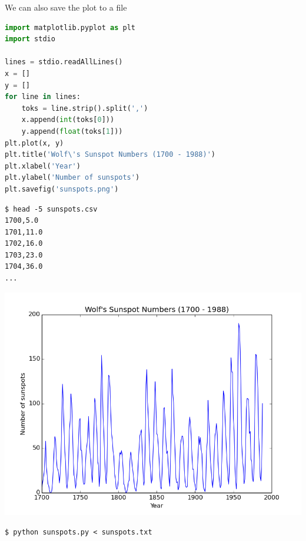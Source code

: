 \documentclass[8pt,a4paper,compress]{beamer}
\begin{document}
\begin{frame}[fragile]
We can also save the plot to a file

\begin{minipage}{200pt}
\begin{lstlisting}[language=Python]
import matplotlib.pyplot as plt
import stdio

lines = stdio.readAllLines()
x = []
y = []
for line in lines:
    toks = line.strip().split(',')
    x.append(int(toks[0]))
    y.append(float(toks[1]))
plt.plot(x, y)
plt.title('Wolf\'s Sunspot Numbers (1700 - 1988)')
plt.xlabel('Year')
plt.ylabel('Number of sunspots')
plt.savefig('sunspots.png')
\end{lstlisting}

\begin{lstlisting}[language={}]
$ head -5 sunspots.csv
1700,5.0
1701,11.0
1702,16.0
1703,23.0
1704,36.0
...
\end{lstlisting}
\end{minipage}%
\begin{minipage}{100pt}
\begin{center}
\includegraphics[scale=0.2]{figures/sunspots.png}

\smallskip

\lstinline{$ python sunspots.py < sunspots.txt}
\end{center}
\end{minipage}
\end{frame}
\end{document}
